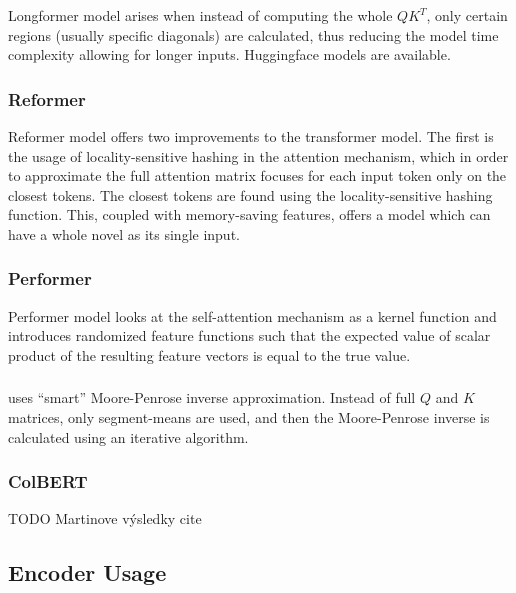 Longformer model \citep{longformer} arises when instead of computing the whole $QK^T$, only certain regions (usually specific diagonals) are calculated, thus reducing the model time complexity allowing for longer inputs.
Huggingface models are available.

\subsubsection{Reformer}

Reformer model \citep{reformer} offers two improvements to the transformer model.
The first is the usage of locality-sensitive hashing in the attention mechanism, which in order to approximate the full attention matrix focuses for each input token only on the closest tokens.
The closest tokens are found using the locality-sensitive hashing function.
This, coupled with memory-saving features, offers a model which can have a whole novel as its single input.

\subsubsection{Performer}

Performer model \citep{performer} looks at the self-attention mechanism as a kernel function and introduces randomized feature functions such that the expected value of scalar product %
of the resulting feature vectors is equal to the true value.

\subsubsection{\nystr{}}

\nystr{} \citep{nystrom} uses ``smart'' Moore-Penrose inverse approximation. Instead of full $Q$ and $K$ matrices, only segment-means are used, and then the Moore-Penrose inverse is calculated using an iterative algorithm.

\subsubsection{ColBERT}

\citep{colbert}
TODO Martinove výsledky cite


\subsection{Encoder Usage}

